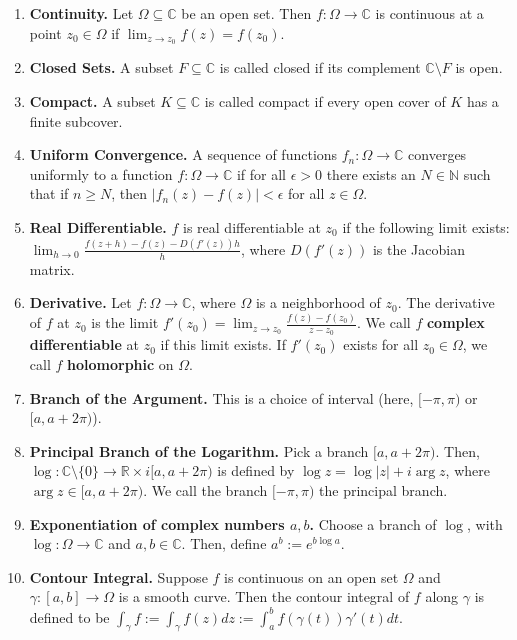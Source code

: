 \documentclass[11pt]{article}
\theoremstyle{definition}
\theoremstyle{named}
\begin{document}
\begin{enumerate}
    \item \textbf{Continuity. } Let $\Omega \subseteq \mathbb{C}$ be an open set. Then $f: \Omega \to \mathbb{C}$ is continuous at a point $z_0 \in \Omega$ if $\lim_{z \to z_0} f(z) = f(z_0)$. 
    \item \textbf{Closed Sets. } A subset $F \subseteq \mathbb{C}$ is called closed if its complement $\mathbb{C} \setminus F$ is open. 
    \item \textbf{Compact. } A subset $K \subseteq \mathbb{C}$ is called compact if every open cover of $K$ has a finite subcover. 
    \item \textbf{Uniform Convergence. } A sequence of functions $f_n: \Omega \to \mathbb{C}$ converges uniformly to a function $f: \Omega \to \mathbb{C}$ if for all $\epsilon > 0$ there exists an $N \in \mathbb{N}$ such that if $n \geq N$, then $|f_n(z) - f(z)| < \epsilon$ for all $z \in \Omega$. 
    \item \textbf{Real Differentiable. } $f$ is real differentiable at $z_0$ if the following limit exists: $\lim_{h \to 0} \frac{f(z+h) - f(z) - D(f'(z))h}{h}$, where $D(f'(z))$ is the Jacobian matrix. 
    \item \textbf{Derivative. } Let $f: \Omega \to \mathbb{C}$, where $\Omega$ is a neighborhood of $z_0$. The derivative of $f$ at $z_0$ is the limit $f'(z_0) = \lim_{z \to z_0} \frac{f(z) - f(z_0)}{z - z_0}$. We call $f$ \textbf{complex differentiable} at $z_0$ if this limit exists. If $f'(z_0)$ exists for all $z_0 \in \Omega$, we call $f$ \textbf{holomorphic} on $\Omega$. 
    \item \textbf{Branch of the Argument. } This is a choice of interval (here, $[-\pi,\pi)$ or $[a,a+2\pi)$). 
    \item \textbf{Principal Branch of the Logarithm. } Pick a branch $[a, a+2\pi)$. Then, $\log: \mathbb{C} \setminus \{0\} \to \mathbb{R} \times i[a,a+2\pi)$ is defined by $\log z = \log |z| + i\arg z$, where $\arg z \in [a, a+2\pi)$. We call the branch $[-\pi,\pi)$ the principal branch. 
    \item \textbf{Exponentiation of complex numbers $a,b$. } Choose a branch of $\log$, with $\log: \Omega \to \mathbb{C}$ and $a,b \in \mathbb{C}$. Then, define $a^b := e^{b\log a}$. 
    \item \textbf{Contour Integral. } Suppose $f$ is continuous on an open set $\Omega$ and $\gamma: [a,b] \to \Omega$ is a smooth curve. Then the contour integral of $f$ along $\gamma$ is defined to be $\int_{\gamma} f := \int_{\gamma} f(z) dz := \int_{a}^{b}f(\gamma(t))\gamma'(t) dt$. 

\end{enumerate}
\end{document}
